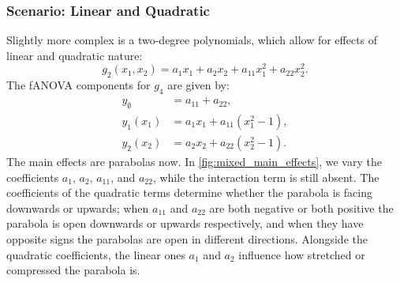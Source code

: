 \subsubsection{Scenario: Linear and Quadratic}
Slightly more complex is a two-degree polynomials, which allow for effects of linear and quadratic nature:
\[
g_2(x_1, x_2) = a_1 x_1 + a_2 x_2 + a_{11} x_1^2 + a_{22} x_2^2.
\]
The fANOVA components for $g_4$ are given by:
\begin{align*}
    y_{\emptyset} &= a_{11} + a_{22}, \\
    y_1(x_1) &= a_1 x_1 + a_{11}(x_1^2 - 1), \\
    y_2(x_2) &= a_2 x_2 + a_{22}(x_2^2 - 1).
\end{align*}
The main effects are parabolas now. In \autoref{fig:mixed_main_effects}, we vary the coefficients $a_1$, $a_2$, $a_{11}$, and $a_{22}$, while the interaction term is still absent.
The coefficients of the quadratic terms determine whether the parabola is facing downwards or upwards; when $a_{11}$ and $a_{22}$ are both negative or both positive the parabola is open downwards or upwards respectively, and when they have opposite signs the parabolas are open in different directions. Alongside the quadratic coefficients, the linear ones $a_1$ and $a_2$ influence how stretched or compressed the parabola is.

